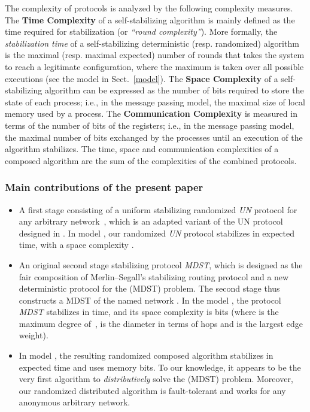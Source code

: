 \documentclass[10pt]{article}
\newcommand{\bi}{\begin{itemize}}
\newcommand{\ei}{\end{itemize}}
\begin{document}
The complexity of protocols is analyzed by the following
complexity measures. The {\bf Time Complexity} of a self-stabilizing
algorithm is mainly defined as the time required for stabilization (or {\em
``round complexity''}). More formally, the {\em stabilization time} of a
self-stabilizing deterministic (resp. randomized) algorithm is the
maximal (resp. maximal expected) number of rounds that takes the
system to reach a legitimate configuration, where the maximum is taken
over all possible executions (see the model  in Sect.~\ref{model}). 
The {\bf Space Complexity} of a self-stabilizing algorithm can be
expressed as the number of bits required to store the state of each
process; i.e., in the message passing model, the maximal size of local
memory used by a process. The {\bf Communication Complexity} is
measured in terms of the number of bits of the registers; i.e., in the
message passing model, the maximal number of bits exchanged by the
processes until an execution of the algorithm stabilizes. The time,
space and communication complexities of a composed algorithm are the
sum of the complexities of the combined protocols.

\subsubsection{Main contributions of the present paper}
\bi
\item A first stage consisting of a uniform stabilizing randomized
{\em UN}  protocol for any arbitrary network~, which is an adapted
variant of the UN protocol designed in \cite{AnEH92}. In model ,
our randomized {\em UN} protocol stabilizes in 
expected time, with a space complexity .
\item An original second stage stabilizing protocol {\em MDST}, which is
designed as the fair composition of Merlin--Segall's stabilizing
routing protocol and a new deterministic protocol for the (MDST)
problem. The second stage thus constructs a MDST of the named network
. In the model , the protocol {\em MDST} stabilizes in
 time, and its space complexity
is  bits (where  is the maximum degree
of~,  is the diameter in terms of hops and  is the
largest edge weight).
\item In model , the resulting randomized composed algorithm
 stabilizes in  expected
time and uses
 memory bits. To our knowledge, it appears
to be the very first algorithm to {\em distributively} solve the (MDST)
problem. Moreover, our randomized distributed algorithm  is
fault-tolerant and works for any anonymous arbitrary network.
\ei
\end{document}
